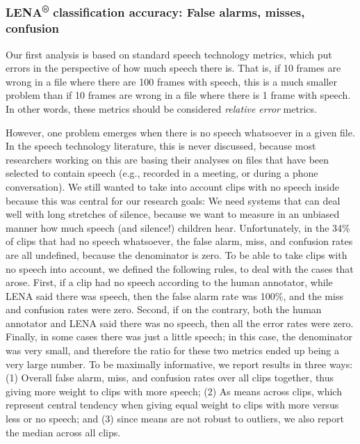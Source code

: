 \documentclass[english,floatsintext,man]{apa6}
\begin{document}
\subsubsection{\texorpdfstring{LENA\textsuperscript{®} classification
accuracy: False alarms, misses,
confusion}{LENA® classification accuracy: False alarms, misses, confusion}}\label{lena-classification-accuracy-false-alarms-misses-confusion}

Our first analysis is based on standard speech technology metrics, which
put errors in the perspective of how much speech there is. That is, if
10 frames are wrong in a file where there are 100 frames with speech,
this is a much smaller problem than if 10 frames are wrong in a file
where there is 1 frame with speech. In other words, these metrics should
be considered \emph{relative error} metrics.

However, one problem emerges when there is no speech whatsoever in a
given file. In the speech technology literature, this is never
discussed, because most researchers working on this are basing their
analyses on files that have been selected to contain speech (e.g.,
recorded in a meeting, or during a phone conversation). We still wanted
to take into account clips with no speech inside because this was
central for our research goals: We need systems that can deal well with
long stretches of silence, because we want to measure in an unbiased
manner how much speech (and silence!) children hear. Unfortunately, in
the 34\% of clips that had no speech whatsoever, the false alarm, miss,
and confusion rates are all undefined, because the denominator is zero.
To be able to take clips with no speech into account, we defined the
following rules, to deal with the cases that arose. First, if a clip had
no speech according to the human annotator, while LENA said there was
speech, then the false alarm rate was 100\%, and the miss and confusion
rates were zero. Second, if on the contrary, both the human annotator
and LENA said there was no speech, then all the error rates were zero.
Finally, in some cases there was just a little speech; in this case, the
denominator was very small, and therefore the ratio for these two
metrics ended up being a very large number. To be maximally informative,
we report results in three ways: (1) Overall false alarm, miss, and
confusion rates over all clips together, thus giving more weight to
clips with more speech; (2) As means across clips, which represent
central tendency when giving equal weight to clips with more versus less
or no speech; and (3) since means are not robust to outliers, we also
report the median across all clips.
\end{document}
